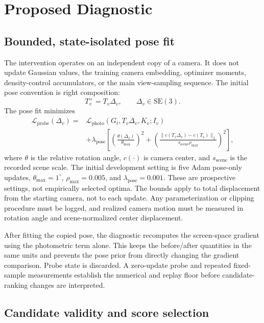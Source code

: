 \documentclass[10pt]{article}
\begin{document}
\section{Proposed Diagnostic}

\subsection{Bounded, state-isolated pose fit}

The intervention operates on an independent copy of a camera. It does not
update Gaussian values, the training camera embedding, optimizer moments,
density-control accumulators, or the main view-sampling sequence. The initial
pose convention is right composition:
\[
T_v^{+}=T_v\Delta_v,\qquad \Delta_v\in\mathrm{SE}(3).
\]
The pose fit minimizes
\[
\begin{split}
\mathcal{L}_{\mathrm{probe}}(\Delta_v)
={}&\mathcal{L}_{\mathrm{photo}}
  (G_t,T_v\Delta_v,K_v;I_v)\\
 &+\lambda_{\mathrm{pose}}\left[
   \left(\frac{\theta(\Delta_v)}{\theta_{\max}}\right)^2
   +\left(
   \frac{\|c(T_v\Delta_v)-c(T_v)\|_2}
        {s_{\mathrm{scene}}\rho_{\max}}
   \right)^2
  \right],
\end{split}
\]
where \(\theta\) is the relative rotation angle, \(c(\cdot)\) is camera center,
and \(s_{\mathrm{scene}}\) is the recorded scene scale. The initial development
setting is five Adam pose-only updates, \(\theta_{\max}=1^\circ\),
\(\rho_{\max}=0.005\), and \(\lambda_{\mathrm{pose}}=0.001\). These are
prospective settings, not empirically selected optima. The bounds apply to
total displacement from the starting camera, not to each update. Any
parameterization or clipping procedure must be logged, and realized camera
motion must be measured in rotation angle and scene-normalized center
displacement.

After fitting the copied pose, the diagnostic recomputes the screen-space
gradient using the photometric term alone. This keeps the before/after
quantities in the same units and prevents the pose prior from directly
changing the gradient comparison. Probe state is discarded. A zero-update
probe and repeated fixed-sample measurements establish the numerical and
replay floor before candidate-ranking changes are interpreted.

\subsection{Candidate validity and score selection}
\end{document}
